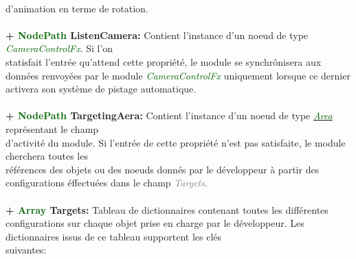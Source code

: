 \documentclass[a4paper, 11pt]{article}
\begin{document}
	\\d'animation en terme de rotation.\\\\
	\newpage \textbf{+ \textcolor{darkgreen}{NodePath} ListenCamera:} Contient l'instance d'un noeud de type 
	\textit{\textcolor{darkgreen}{CameraControlFx}}. Si l'on \\statisfait l'entrée qu'attend cette 
	propriété, le module se synchrônisera aux données renvoyées par le module \textit{\textcolor{darkgreen}
	{CameraControlFx}} uniquement lorsque ce dernier activera son système de pistage automatique.\\\\
	\textbf{+ \textcolor{darkgreen}{NodePath} TargetingAera:} Contient l'instance d'un noeud de type
	\href{https://docs.godotengine.org/fr/stable/classes/class_area.html}{\textit{\textcolor{darkgreen}
	{Area}}} représentant le champ \\d'activité du module. Si l'entrée de cette propriété n'est pas 
	satisfaite, le module cherchera toutes les \\références des objets ou des noeuds donnés par le 
	développeur à partir des configurations éffectuées dans le champ \textit{\textcolor{gray}{Targets}}.\\\\
	\textbf{+ \textcolor{darkgreen}{Array} Targets:} Tableau de dictionnaires contenant toutes les 
	différentes configurations sur chaque objet prise en charge par le développeur. Les dictionnaires issus 
	de ce tableau supportent les clés \\suivantes:
\end{document}
